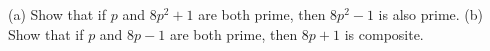 (a) Show that if $p$ and $8p^2+1$ are both prime, then $8p^2-1$ is also prime. (b) Show that if $p$ and $8p-1$ are both prime, then $8p+1$ is composite.
